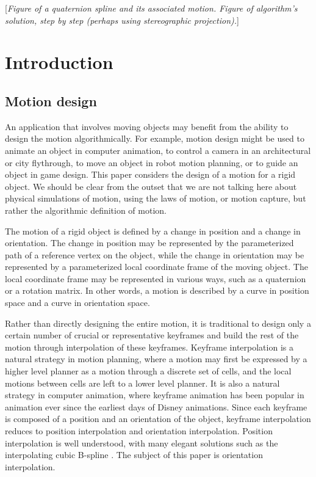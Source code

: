 \documentclass[12pt]{article}
\begin{document}
[{\em Figure of a quaternion spline and its associated motion.
Figure of algorithm's solution, step by step (perhaps using stereographic projection).}]

\clearpage


\section{Introduction}

\subsection{Motion design}

An application that involves moving objects may benefit from the ability
to design the motion algorithmically.
For example, motion design might be used to animate an object in computer animation,
to control a camera in an architectural or city flythrough,
to move an object in robot motion planning, or to guide an object in game design.
This paper considers the design of a motion for a rigid object.
We should be clear from the outset that we are not talking here about
physical simulations of motion, using the laws of motion, or motion capture,
but rather the algorithmic definition of motion.

The motion of a rigid object is defined by a change in position 
and a change in orientation.
The change in position may be represented by the parameterized path 
of a reference vertex on the object,
while the change in orientation may be represented by 
a parameterized local coordinate frame of the moving object.
The local coordinate frame may be represented in various ways, such as 
a quaternion or a rotation matrix.
In other words, a motion is described by a curve in position space and a curve
in orientation space.

Rather than directly designing the entire motion, it is traditional
to design only a certain number of crucial or representative keyframes 
and build the rest of the motion through interpolation of these keyframes.
Keyframe interpolation is a natural strategy in motion planning, 
where a motion may first be expressed by a higher level planner 
as a motion through a discrete set of cells, 
and the local motions between cells are left to a lower level planner.
It is also a natural strategy in computer animation, where
keyframe animation has been popular in animation ever since the
earliest days of Disney animations. %
Since each keyframe is composed of a position and an orientation of the object,
keyframe interpolation reduces to position interpolation and orientation interpolation.
Position interpolation is well understood,
with many elegant solutions such as the interpolating cubic B-spline \cite{farin02}.
The subject of this paper is 
orientation interpolation.
\end{document}
